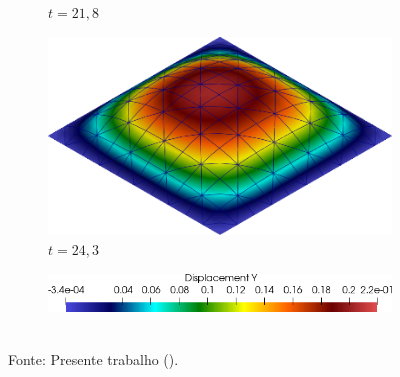 \begin{figure}[h!]
\begin{subfigure}[b]{0.35\textwidth}
        \caption{$t=21,8$}
    \end{subfigure}
    \begin{subfigure}[b]{0.35\textwidth}
        \includegraphics[width=\linewidth]{Figuras/FSI-Cavity3D/d24-3.png}
        \caption{$t=24,3$}
    \end{subfigure}
    \begin{subfigure}[b]{0.5\textwidth}
        \includegraphics[width=\linewidth]{Figuras/FSI-Cavity3D/ld.png}
    \end{subfigure}
    \\Fonte: Presente trabalho (\the\year).
    \label{fig:Cavity3D-time}
\end{figure}

